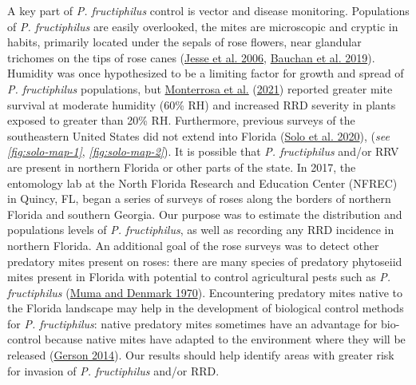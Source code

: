 \documentclass[12pt,final,CPage]{ufthesis}
\renewcommand{\hypertarget}[2]{\leavevmode\oldhypertarget{#1}{#2}}
\begin{document}
{  A key part of \emph{P. fructiphilus} control is vector and disease monitoring. Populations of \emph{P. fructiphilus} are easily overlooked, the mites are microscopic and cryptic in habits, primarily located under the sepals of rose flowers, near glandular trichomes on the tips of rose canes (\protect\hyperlink{ref-Jesse2006}{Jesse et al. 2006}, \protect\hyperlink{ref-Bauchan2019}{Bauchan et al. 2019}). Humidity was once hypothesized to be a limiting factor for growth and spread of \emph{P. fructiphilus} populations, but \protect\hyperlink{ref-Monterrosa2021}{Monterrosa et al.} (\protect\hyperlink{ref-Monterrosa2021}{2021}) reported greater mite survival at moderate humidity (60\% RH) and increased RRD severity in plants exposed to greater than 20\% RH. Furthermore, previous surveys of the southeastern United States did not extend into Florida (\protect\hyperlink{ref-Solo2020}{Solo et al. 2020}), (\emph{see} \emph{\ref{fig:solo-map-1}}, \emph{\ref{fig:solo-map-2}}). It is possible that \emph{P. fructiphilus} and/or RRV are present in northern Florida or other parts of the state. In 2017, the entomology lab at the North Florida Research and Education Center (NFREC) in Quincy, FL, began a series of surveys of roses along the borders of northern Florida and southern Georgia. Our purpose was to estimate the distribution and populations levels of \emph{P. fructiphilus}, as well as recording any RRD incidence in northern Florida. An additional goal of the rose surveys was to detect other predatory mites present on roses: there are many species of predatory phytoseiid mites present in Florida with potential to control agricultural pests such as \emph{P. fructiphilus} (\protect\hyperlink{ref-Muma1970}{Muma and Denmark 1970}). Encountering predatory mites native to the Florida landscape may help in the development of biological control methods for \emph{P. fructiphilus}: native predatory mites sometimes have an advantage for bio-control because native mites have adapted to the environment where they will be released (\protect\hyperlink{ref-Gerson2014}{Gerson 2014}). Our results should help identify areas with greater risk for invasion of \emph{P. fructiphilus} and/or RRD.

  \hypertarget{mm-survey}{%
  \section{Materials \& Methods}\label{mm-survey}}

}
\end{document}
